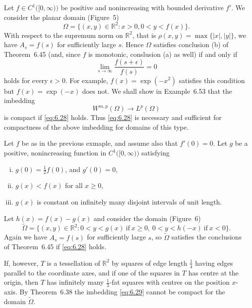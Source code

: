 \begin{example}
  Let $f\in C^1\bigl([0,\infty)\bigr)$ be positive and nonincreasing with
  bounded derivative $f'$. We consider the planar domain (Figure~5)
  \[ \Omega = \{(x,y)\in\mathbb{R}^2: x>0, 0<y<f(x)\}. \]
  With respect to the supremum norm on $\mathbb{R}^2$, that is
  $\rho(x,y) = \max\{|x|,|y|\}$, we have $A_s=f(s)$ for sufficiently large $s$.
  Hence $\Omega$ satisfies conclusion (b) of Theorem~6.45 (and, since $f$ is monotonic,
  conslusion (a) as well) if and only if
  \begin{equation}\label{eq:6.28}
    \lim_{s\to\infty} \frac{f(s+\epsilon)}{f(s)} = 0
  \end{equation}
  holds for every $\epsilon>0$. For example, $f(x) = \exp(-x^2)$ satisfies
  this condition but $f(x) = \exp(-x)$ does not. We shall show in Example~6.53
  that the imbedding
  \begin{equation}\label{eq:6.29}
    W^{m,p}(\Omega) \to L^p(\Omega)
  \end{equation}
  is compact if \eqref{eq:6.28} holds. Thus \eqref{eq:6.28} is necessary
  and sufficient for compactness of the above imbedding for domains of this type.
\end{example}


\begin{example}
  Let $f$ be as in the previous exmaple, and assume also that $f'(0)=0$.
  Let $g$ be a positive, nonincreasing function in $C^1\bigl([0,\infty)\bigr)$
  satisfying
  \begin{enumerate}[(i)]
    \item $g(0) = \frac12 f(0)$, and $g'(0)=0$,
    \item $g(x)<f(x)$ for all $x\geq 0$,
    \item $g(x)$ is constant on infinitely many disjoint intervals of unit length.
  \end{enumerate}
  Let $h(x)=f(x)-g(x)$ and consider the domain (Figure~6)
  \[ \tilde{\Omega} = \{(x,y)\in\mathbb{R}^2: 0<y<g(x)\ \text{if}\ x\geq 0,\ 
      0<y<h(-x)\ \text{if}\ x<0\}. \]
  Again we have $A_s=f(s)$ for sufficiently large $s$, so $\tilde{\Omega}$
  satisfies the conclusions of Theorem~6.45 if \eqref{eq:6.28} holds.

  If, however, $T$ is a tessellation of $\mathbb{R}^2$ by squares of edge
  length $\frac14$ having edges parallel to the coordinate axes, and if
  one of the squares in $T$ has centre at the origin, then $T$ has infinitely
  many $\frac13$-fat squares with centres on the position $x$-axis.
  By Theorem~6.38 the imbedding \eqref{eq:6.29} cannot be compact
  for the domain $\tilde{\Omega}$.
\end{example}


